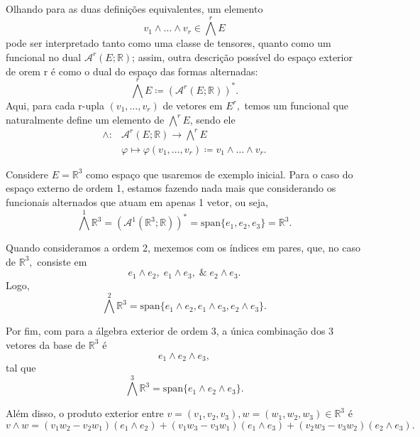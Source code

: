 \documentclass[../differential_forms.tex]{subfiles}
\begin{document}
Olhando para as duas definições equivalentes, um elemento
\[
	v_1\wedge\dotsc \wedge v_r\in \bigwedge^{r}E
\]
pode ser interpretado tanto como uma classe de tensores, quanto como um funcional no dual \(\mathcal{A}^{r}(E; \mathbb{R})\); assim, outra descrição
possível do espaço exterior de orem r é como o dual do espaço das formas alternadas:
\[
	\bigwedge^{r} E \coloneqq (\mathcal{A}^{r}(E; \mathbb{R}))^{*}.
\]
Aqui, para cada r-upla \((v_1, \dotsc , v_r)\) de vetores em \(E^{r},\) temos um funcional que naturalmente define um elemento de \(\bigwedge^{r}E\), sendo ele
\begin{align*}
	\wedge : & \mathcal{A}^{r}(E; \mathbb{R})\rightarrow \bigwedge^{r}E                              \\
	         & \varphi \longmapsto \varphi (v_1, \dotsc , v_r)\coloneqq v_1\wedge \dotsc \wedge v_r.
\end{align*}
\begin{example}
	Considere \(E = \mathbb{R}^{3}\) como espaço que usaremos de exemplo inicial. Para o caso do espaço externo de ordem 1, estamos fazendo nada mais que considerando
	os funcionais alternados que atuam em apenas 1 vetor, ou seja,
	\[
		\bigwedge^{1}\mathbb{R}^{3} = (\mathcal{A}^{1}(\mathbb{R}^{3}; \mathbb{R}))^* = \mathrm{span}\{e_1, e_2, e_3\} = \mathbb{R}^{3}.
	\]

	Quando consideramos a ordem 2, mexemos com os índices em pares, que, no caso de \(\mathbb{R}^{3},\) consiste em
	\[
		e_1 \wedge e_2,\; e_1 \wedge e_3,\;\&\; e_{2}\wedge e_3.
	\]
	Logo,
	\[
		\bigwedge^{2}\mathbb{R}^{3} = \mathrm{span}\{e_1\wedge e_2, e_1\wedge e_3, e_2\wedge e_3\}.
	\]

	Por fim, com para a álgebra exterior de ordem 3, a única combinação dos 3 vetores da base de \(\mathbb{R}^{3}\) é
	\[
		e_1 \wedge e_2 \wedge e_3,
	\]
	tal que
	\[
		\bigwedge^{3}\mathbb{R}^{3} = \mathrm{span}\{e_1 \wedge e_2\wedge e_3\}.
	\]

	Além disso, o produto exterior entre \(v=(v_1, v_2, v_3), w=(w_1, w_2, w_3)\in \mathbb{R}^{3}\) é
	\[
		v\wedge w = (v_1w_2 - v_2w_1)(e_1\wedge e_2) + (v_1w_3 - v_3w_1)(e_1\wedge e_3) + (v_2w_3-v_3w_2)(e_2\wedge e_3).
	\]
\end{example}
\end{document}
